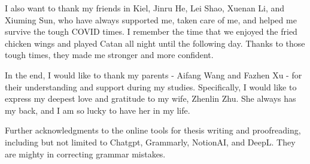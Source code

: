 I also want to thank my friends in Kiel, Jinru He, Lei Shao, Xuenan Li, and Xiuming Sun, who have always supported me, taken care of me, and helped me survive the tough COVID times. I remember the time that we enjoyed the fried chicken wings and played Catan all night until the following day. Thanks to those tough times, they made me stronger and more confident.

In the end, I would like to thank my parents - Aifang Wang and Fazhen Xu - for their understanding and support during my studies. 
Specifically, I would like to express my deepest love and gratitude to my wife, Zhenlin Zhu. She always has my back, and I am so lucky to have her in my life.


Further acknowledgments to the online tools for thesis writing and proofreading, including but not limited to Chatgpt, Grammarly, NotionAI, and DeepL. They are mighty in correcting grammar mistakes.
 





